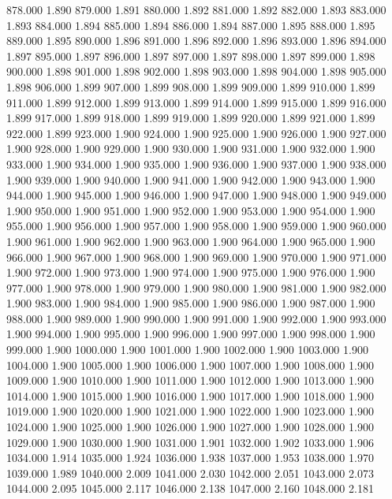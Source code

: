 878.000 1.890 
879.000 1.891 
880.000 1.892 
881.000 1.892 
882.000 1.893 
883.000 1.893 
884.000 1.894 
885.000 1.894 
886.000 1.894 
887.000 1.895 
888.000 1.895 
889.000 1.895 
890.000 1.896 
891.000 1.896 
892.000 1.896 
893.000 1.896 
894.000 1.897 
895.000 1.897 
896.000 1.897 
897.000 1.897 
898.000 1.897 
899.000 1.898 
900.000 1.898 
901.000 1.898 
902.000 1.898 
903.000 1.898 
904.000 1.898 
905.000 1.898 
906.000 1.899 
907.000 1.899 
908.000 1.899 
909.000 1.899 
910.000 1.899 
911.000 1.899 
912.000 1.899 
913.000 1.899 
914.000 1.899 
915.000 1.899 
916.000 1.899 
917.000 1.899 
918.000 1.899 
919.000 1.899 
920.000 1.899 
921.000 1.899 
922.000 1.899 
923.000 1.900 
924.000 1.900 
925.000 1.900 
926.000 1.900 
927.000 1.900 
928.000 1.900 
929.000 1.900 
930.000 1.900 
931.000 1.900 
932.000 1.900 
933.000 1.900 
934.000 1.900 
935.000 1.900 
936.000 1.900 
937.000 1.900 
938.000 1.900 
939.000 1.900 
940.000 1.900 
941.000 1.900 
942.000 1.900 
943.000 1.900 
944.000 1.900 
945.000 1.900 
946.000 1.900 
947.000 1.900 
948.000 1.900 
949.000 1.900 
950.000 1.900 
951.000 1.900 
952.000 1.900 
953.000 1.900 
954.000 1.900 
955.000 1.900 
956.000 1.900 
957.000 1.900 
958.000 1.900 
959.000 1.900 
960.000 1.900 
961.000 1.900 
962.000 1.900 
963.000 1.900 
964.000 1.900 
965.000 1.900 
966.000 1.900 
967.000 1.900 
968.000 1.900 
969.000 1.900 
970.000 1.900 
971.000 1.900 
972.000 1.900 
973.000 1.900 
974.000 1.900 
975.000 1.900 
976.000 1.900 
977.000 1.900 
978.000 1.900 
979.000 1.900 
980.000 1.900 
981.000 1.900 
982.000 1.900 
983.000 1.900 
984.000 1.900 
985.000 1.900 
986.000 1.900 
987.000 1.900 
988.000 1.900 
989.000 1.900 
990.000 1.900 
991.000 1.900 
992.000 1.900 
993.000 1.900 
994.000 1.900 
995.000 1.900 
996.000 1.900 
997.000 1.900 
998.000 1.900 
999.000 1.900 
1000.000 1.900 
1001.000 1.900 
1002.000 1.900 
1003.000 1.900 
1004.000 1.900 
1005.000 1.900 
1006.000 1.900 
1007.000 1.900 
1008.000 1.900 
1009.000 1.900 
1010.000 1.900 
1011.000 1.900 
1012.000 1.900 
1013.000 1.900 
1014.000 1.900 
1015.000 1.900 
1016.000 1.900 
1017.000 1.900 
1018.000 1.900 
1019.000 1.900 
1020.000 1.900 
1021.000 1.900 
1022.000 1.900 
1023.000 1.900 
1024.000 1.900 
1025.000 1.900 
1026.000 1.900 
1027.000 1.900 
1028.000 1.900 
1029.000 1.900 
1030.000 1.900 
1031.000 1.901 
1032.000 1.902 
1033.000 1.906 
1034.000 1.914 
1035.000 1.924 
1036.000 1.938 
1037.000 1.953 
1038.000 1.970 
1039.000 1.989 
1040.000 2.009 
1041.000 2.030 
1042.000 2.051 
1043.000 2.073 
1044.000 2.095 
1045.000 2.117 
1046.000 2.138 
1047.000 2.160 
1048.000 2.181 
